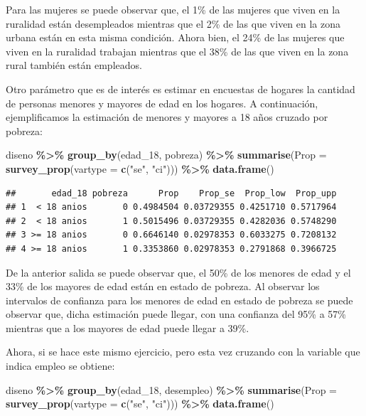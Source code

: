 \documentclass[
  spanish,
  12pt,
]{book}
\newenvironment{Shaded}{\begin{snugshade}}{\end{snugshade}}
\newcommand{\AttributeTok}[1]{\textcolor[rgb]{0.13,0.29,0.53}{#1}}
\newcommand{\FunctionTok}[1]{\textcolor[rgb]{0.13,0.29,0.53}{\textbf{#1}}}
\newcommand{\NormalTok}[1]{#1}
\newcommand{\SpecialCharTok}[1]{\textcolor[rgb]{0.81,0.36,0.00}{\textbf{#1}}}
\newcommand{\StringTok}[1]{\textcolor[rgb]{0.31,0.60,0.02}{#1}}
\begin{document}
Para las mujeres se puede observar que, el 1\% de las mujeres que viven en la ruralidad están desempleados mientras que el 2\% de las que viven en la zona urbana están en esta misma condición. Ahora bien, el 24\% de las mujeres que viven en la ruralidad trabajan mientras que el 38\% de las que viven en la zona rural también están empleados.

Otro parámetro que es de interés es estimar en encuestas de hogares la cantidad de personas menores y mayores de edad en los hogares. A continuación, ejemplificamos la estimación de menores y mayores a 18 años cruzado por pobreza:

\begin{Shaded}
\begin{Highlighting}[]
\NormalTok{diseno }\SpecialCharTok{\%\textgreater{}\%} \FunctionTok{group\_by}\NormalTok{(edad\_18, pobreza) }\SpecialCharTok{\%\textgreater{}\%} 
           \FunctionTok{summarise}\NormalTok{(}\AttributeTok{Prop =} \FunctionTok{survey\_prop}\NormalTok{(}\AttributeTok{vartype =}  \FunctionTok{c}\NormalTok{(}\StringTok{"se"}\NormalTok{, }\StringTok{"ci"}\NormalTok{))) }\SpecialCharTok{\%\textgreater{}\%}
           \FunctionTok{data.frame}\NormalTok{()}
\end{Highlighting}
\end{Shaded}

\begin{verbatim}
##       edad_18 pobreza      Prop    Prop_se  Prop_low  Prop_upp
## 1  < 18 anios       0 0.4984504 0.03729355 0.4251710 0.5717964
## 2  < 18 anios       1 0.5015496 0.03729355 0.4282036 0.5748290
## 3 >= 18 anios       0 0.6646140 0.02978353 0.6033275 0.7208132
## 4 >= 18 anios       1 0.3353860 0.02978353 0.2791868 0.3966725
\end{verbatim}

De la anterior salida se puede observar que, el 50\% de los menores de edad y el 33\% de los mayores de edad están en estado de pobreza. Al observar los intervalos de confianza para los menores de edad en estado de pobreza se puede observar que, dicha estimación puede llegar, con una confianza del 95\% a 57\% mientras que a los mayores de edad puede llegar a 39\%.

Ahora, si se hace este mismo ejercicio, pero esta vez cruzando con la variable que indica empleo se obtiene:

\begin{Shaded}
\begin{Highlighting}[]
\NormalTok{diseno }\SpecialCharTok{\%\textgreater{}\%} \FunctionTok{group\_by}\NormalTok{(edad\_18, desempleo) }\SpecialCharTok{\%\textgreater{}\%} 
           \FunctionTok{summarise}\NormalTok{(}\AttributeTok{Prop =} \FunctionTok{survey\_prop}\NormalTok{(}\AttributeTok{vartype =}  \FunctionTok{c}\NormalTok{(}\StringTok{"se"}\NormalTok{, }\StringTok{"ci"}\NormalTok{))) }\SpecialCharTok{\%\textgreater{}\%}
           \FunctionTok{data.frame}\NormalTok{()}
\end{Highlighting}
\end{Shaded}
\end{document}

